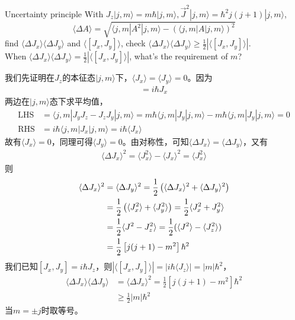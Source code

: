 \documentclass[UTF8,12pt]{article} %
\makeatletter
\newenvironment{proof}[1][\protect\proofname]{\par
\normalfont\topsep6\p@\@plus6\p@\relax
\trivlist
\itemindent\parindent
\item[\hskip\labelsep
\scshape
#1]\ignorespaces
}{%
\endtrivlist\@endpefalse
}
\renewcommand{\proofname}{\it{Solution}}
\makeatother
\begin{document}
\begin{exercise}{Uncertainty principle}{}
With $J_z|j,m\rangle = m\hbar|j,m\rangle, \vec{J}^2|j,m\rangle = \hbar^2 j(j+1)|j,m\rangle$, $$\langle\Delta A\rangle = \sqrt{\langle j,m|A^2|j,m\rangle - (\langle j,m|A|j,m\rangle)^2}$$ find $\langle\Delta J_x\rangle\langle\Delta J_y\rangle$ and $\langle[J_x, J_y]\rangle$, check $\langle\Delta J_x\rangle\langle\Delta J_y\rangle\ge\frac{1}{2}|\langle[J_x, J_y]\rangle|$.\\ When $\langle\Delta J_x\rangle\langle\Delta J_y\rangle = \frac{1}{2}|\langle[J_x, J_y]\rangle|$, what's the requirement of $m$?
\end{exercise}

\begin{proof}[解]
我们先证明在$J_z$的本征态$|j,m\rangle$下，$\langle J_x\rangle = \langle J_y\rangle = 0$。因为
\begin{align}
[J_y, J_z] = i\hbar J_x
\end{align}
两边在$|j,m\rangle$态下求平均值，
\begin{align}
\text{LHS} &= \langle j,m|J_yJ_z - J_zJ_y|j,m\rangle = m\hbar\langle j,m|J_y|j,m\rangle - m\hbar\langle j,m|J_y|j,m\rangle = 0 \\
\text{RHS} &= i\hbar\langle j,m|J_x|j,m\rangle = i\hbar\langle J_x\rangle
\end{align}
故有$\langle J_x\rangle = 0$，同理可得$\langle J_y\rangle = 0$。由对称性，可知$\langle\Delta J_x\rangle = \langle\Delta J_y\rangle$，又有
\begin{align}
\langle\Delta J_x\rangle^2 = \langle J_x^2\rangle - \langle J_x\rangle^2 = \langle J_x^2\rangle
\end{align}
则
\begin{align}
\langle\Delta J_x\rangle^2 &= \langle\Delta J_y\rangle^2 = \frac{1}{2}\left(\langle\Delta J_x\rangle^2 + \langle\Delta J_y\rangle^2\right) \notag\\
&= \frac{1}{2} \left(\langle J_x^2\rangle + \langle J_y^2\rangle\right) = \frac{1}{2} \langle J_x^2 + J_y^2\rangle \notag\\
&= \frac{1}{2} \langle J^2 - J_z^2\rangle = \frac{1}{2} (\langle J^2\rangle - \langle J_z^2\rangle) \notag\\
&= \frac{1}{2} \left[j(j+1) - m^2\right]\hbar^2
\end{align}
我们已知$[J_x,J_y]=i\hbar J_z$，则$\left|\langle[J_x,J_y]\rangle\right| = \left|i\hbar\langle J_z\rangle\right| = \left|m\right|\hbar^2$，
\begin{align}
\langle\Delta J_x\rangle\langle\Delta J_y\rangle &= \langle\Delta J_x\rangle^2 = \frac{1}{2} \left[j(j+1) - m^2\right]\hbar^2 \\
&\ge \frac{1}{2} \left|m\right|\hbar^2
\end{align}
当$m = \pm j$时取等号。
\end{proof}
\end{document}
